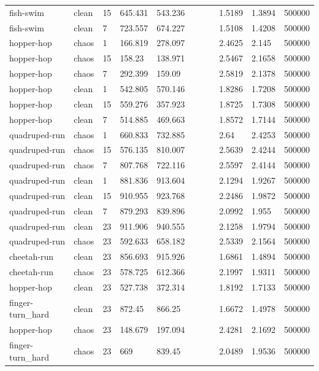 \begin{tabular}{lllllllllll}
fish-swim & clean & 15 & 645.431 & 543.236 &  &  &  & 1.5189 & 1.3894 & 500000 \\
fish-swim & clean & 7 & 723.557 & 674.227 &  &  &  & 1.5108 & 1.4208 & 500000 \\
hopper-hop & chaos & 1 & 166.819 & 278.097 &  &  &  & 2.4625 & 2.145 & 500000 \\
hopper-hop & chaos & 15 & 158.23 & 138.971 &  &  &  & 2.5467 & 2.1658 & 500000 \\
hopper-hop & chaos & 7 & 292.399 & 159.09 &  &  &  & 2.5819 & 2.1378 & 500000 \\
hopper-hop & clean & 1 & 542.805 & 570.146 &  &  &  & 1.8286 & 1.7208 & 500000 \\
hopper-hop & clean & 15 & 559.276 & 357.923 &  &  &  & 1.8725 & 1.7308 & 500000 \\
hopper-hop & clean & 7 & 514.885 & 469.663 &  &  &  & 1.8572 & 1.7144 & 500000 \\
quadruped-run & chaos & 1 & 660.833 & 732.885 &  &  &  & 2.64 & 2.4253 & 500000 \\
quadruped-run & chaos & 15 & 576.135 & 810.007 &  &  &  & 2.5639 & 2.4244 & 500000 \\
quadruped-run & chaos & 7 & 807.768 & 722.116 &  &  &  & 2.5597 & 2.4144 & 500000 \\
quadruped-run & clean & 1 & 881.836 & 913.604 &  &  &  & 2.1294 & 1.9267 & 500000 \\
quadruped-run & clean & 15 & 910.955 & 923.768 &  &  &  & 2.2486 & 1.9872 & 500000 \\
quadruped-run & clean & 7 & 879.293 & 839.896 &  &  &  & 2.0992 & 1.955 & 500000 \\
quadruped-run & clean & 23 & 911.906 & 940.555 &  &  &  & 2.1258 & 1.9794 & 500000 \\
quadruped-run & chaos & 23 & 592.633 & 658.182 &  &  &  & 2.5339 & 2.1564 & 500000 \\
cheetah-run & clean & 23 & 856.693 & 915.926 &  &  &  & 1.6861 & 1.4894 & 500000 \\
cheetah-run & chaos & 23 & 578.725 & 612.366 &  &  &  & 2.1997 & 1.9311 & 500000 \\
hopper-hop & clean & 23 & 527.738 & 372.314 &  &  &  & 1.8192 & 1.7133 & 500000 \\
finger-turn\_hard & clean & 23 & 872.45 & 866.25 &  &  &  & 1.6672 & 1.4978 & 500000 \\
hopper-hop & chaos & 23 & 148.679 & 197.094 &  &  &  & 2.4281 & 2.1692 & 500000 \\
finger-turn\_hard & chaos & 23 & 669 & 839.45 &  &  &  & 2.0489 & 1.9536 & 500000 \\

\end{tabular}
